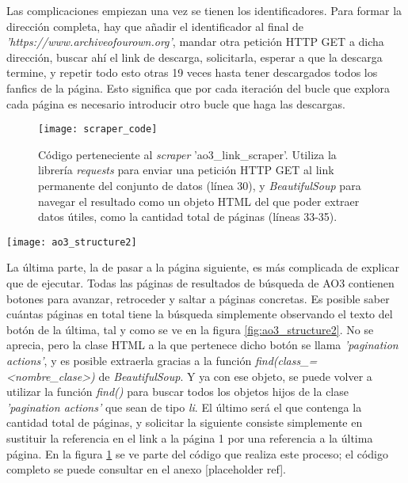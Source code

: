 \documentclass{pre-tfg}
\newcommand{\refToLinkScraperCode}{[placeholder ref]}
\begin{document}
Las complicaciones empiezan una vez se tienen los identificadores. Para formar la dirección completa, hay que añadir el identificador al final de \textit{'https://www.archiveofourown.org'}, mandar otra petición HTTP GET a dicha dirección, buscar ahí el link de descarga, solicitarla, esperar a que la descarga termine, y repetir todo esto otras 19 veces hasta tener descargados todos los fanfics de la página. Esto significa que por cada iteración del bucle que explora cada página es necesario introducir otro bucle que haga las descargas.

\begin{figure}
	\texttt{[image: scraper\_code]}
	\caption{Código perteneciente al \textit{scraper} 'ao3\_link\_scraper'. Utiliza la librería \textit{requests} para enviar una petición HTTP GET al link permanente del conjunto de datos (línea 30), y \textit{BeautifulSoup} para navegar el resultado como un objeto HTML del que poder extraer datos útiles, como la cantidad total de páginas (líneas 33-35).}
	\label{code:scraper1}
	\centering
\end{figure}

\begin{SCfigure}
	\caption{Navegación de páginas de búsqueda de AO3. Todos los botones vienen con su número de página, y se puede ver cuál es la última}
	\label{fig:ao3_structure2}
	\texttt{[image: ao3\_structure2]}
\end{SCfigure}

La última parte, la de pasar a la página siguiente, es más complicada de explicar que de ejecutar. Todas las páginas de resultados de búsqueda de AO3 contienen botones para avanzar, retroceder y saltar a páginas concretas. Es posible saber cuántas páginas en total tiene la búsqueda simplemente observando el texto del botón de la última, tal y como se ve en la figura \ref{fig:ao3_structure2}. No se aprecia, pero la clase HTML a la que pertenece dicho botón se llama \textit{'pagination actions'}, y es posible extraerla gracias a la función \textit{find(class\_=<nombre\_clase>)} de \textit{BeautifulSoup}. Y ya con ese objeto, se puede volver a utilizar la función \textit{find()} para buscar todos los objetos hijos de la clase \textit{'pagination actions'} que sean de tipo \textit{li}. El último será el que contenga la cantidad total de páginas, y solicitar la siguiente consiste simplemente en sustituir la referencia en el link a la página 1 por una referencia a la última página. En la figura \ref{code:scraper1} se ve parte del código que realiza este proceso; el código completo se puede consultar en el anexo \refToLinkScraperCode.
\end{document}

